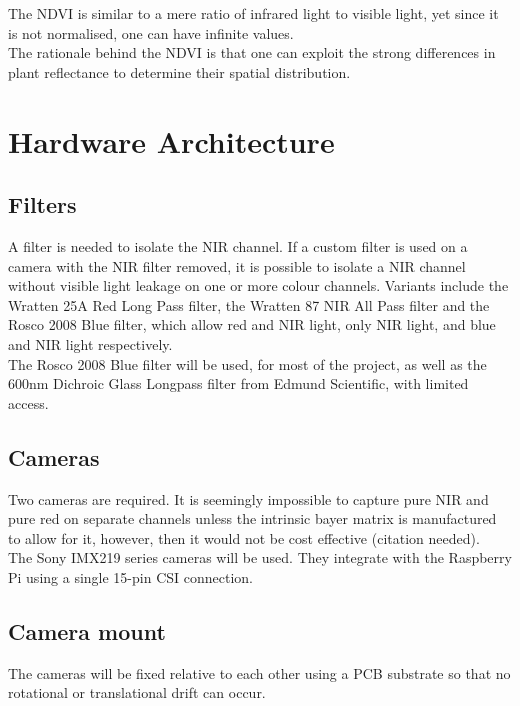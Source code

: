 The NDVI is similar to a mere ratio of infrared light to visible light, yet since it is not normalised, one can have infinite values.\\

The rationale behind the NDVI is that one can exploit the strong differences in plant reflectance to determine their spatial distribution.\\

\section{Hardware Architecture}

\subsection{Filters}

A filter is needed to isolate the NIR channel. If a custom filter is used on a camera with the NIR filter removed, it is possible to isolate a NIR channel without visible light leakage on one or more colour channels. Variants include the Wratten 25A Red Long Pass filter, the Wratten 87 NIR All Pass filter and the Rosco 2008 Blue filter, which allow red and NIR light, only NIR light, and blue and NIR light respectively.\\

The Rosco 2008 Blue filter will be used, for most of the project, as well as the 600nm Dichroic Glass Longpass filter from Edmund Scientific, with limited access.

\subsection{Cameras}

Two cameras are required. It is seemingly impossible to capture pure NIR and pure red on separate channels unless the intrinsic bayer matrix is manufactured to allow for it, however, then it would not be cost effective (citation needed).\\

The Sony IMX219 series cameras will be used. They integrate with the Raspberry Pi using a single 15-pin CSI connection.

\subsection{Camera mount}

The cameras will be fixed relative to each other using a PCB substrate so that no rotational or translational drift can occur.

